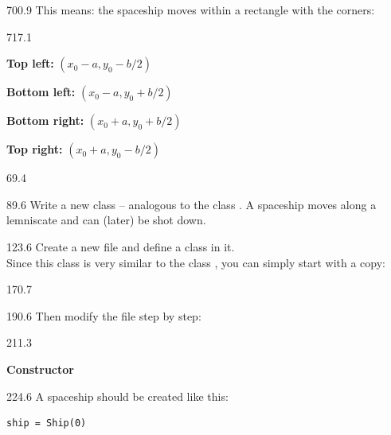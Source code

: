 \documentclass{aslab}
\begin{document}
\begin{region}{700.9}
This means: the spaceship moves within a rectangle with the corners:
\end{region}

\begin{region}[pitch=18.37]{717.1}
\begin{dashlist}
\item \textbf{Top left:} $(x_0-a, y_0-b/2)$
\item \textbf{Bottom left:} $(x_0-a, y_0+b/2)$
\item \textbf{Bottom right:} $(x_0+a, y_0+b/2)$
\item \textbf{Top right:} $(x_0+a, y_0-b/2)$
\end{dashlist}
\end{region}

\nextpage
\begin{region}{69.4}
\end{region}

\begin{region}[pitch=13.3]{89.6}
Write a new class  -- analogous to the class . A
spaceship moves along a lemniscate and can (later) be shot down.
\end{region}

\begin{region}[pitch=13.5]{123.6}
Create a new file  and define a class  in it.\\
Since this class is very similar to the class , you can simply
start with a copy:
\end{region}

\begin{region}{170.7}
\end{region}

\begin{region}{190.6}
Then modify the file step by step:
\end{region}

\begin{region}{211.3}
\begin{alist}[label={\bfseries(\Alph*)}]
\item \textbf{Constructor}
\end{alist}
\end{region}

\begin{region}[x=74.7,right=0,pitch=13.4]{224.6}
A spaceship should be created like this:
\begin{lstlisting}[style=plain]
ship = Ship(0)
\end{lstlisting}
\end{region}
\end{document}
